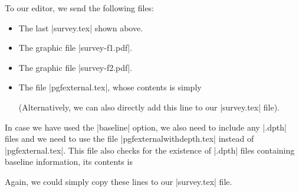 To our editor, we send the following files:
%
\begin{itemize}
    \item The last |survey.tex| shown above.
    \item The graphic file |survey-f1.pdf|.
    \item The graphic file |survey-f2.pdf|.
    \item The file |pgfexternal.tex|, whose contents is simply
\begin{codeexample}
\long{}
\end{codeexample}
        (Alternatively, we can also directly add this line to our |survey.tex|
        file).
\end{itemize}
%
In case we have used the |baseline| option, we also need to include any |.dpth|
files and we need to use the file |pgfexternalwithdepth.tex| instead of
|pgfexternal.tex|. This file also checks for the existence of |.dpth| files
containing baseline information, its contents is
%
\begin{codeexample}
\long{}
\end{codeexample}
%
Again, we could simply copy these lines to our |survey.tex| file.


